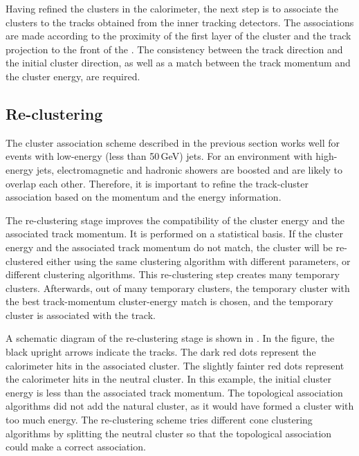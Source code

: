 Having refined the clusters in the calorimeter, the next step is to associate the clusters to the tracks obtained from the inner tracking detectors. The associations  are made according to the proximity of the first layer of the cluster and the track projection to the front of the \ECAL. The consistency between the track direction and the initial cluster direction, as well as a match between the track momentum and the cluster energy, are required.


\subsection{Re-clustering}

The cluster association scheme described in the previous section works well for events with low-energy (less than 50\,GeV) jets. For an environment with  high-energy jets, electromagnetic and  hadronic showers are  boosted and are likely to overlap each other. Therefore, it is important to refine the track-cluster association based on the momentum and the energy information.

The re-clustering stage improves the compatibility of the cluster energy and the associated track momentum. It is performed on a statistical basis. If the cluster energy and the associated track momentum do not match, the cluster will be re-clustered either using the same clustering algorithm with different parameters, or different clustering algorithms. This re-clustering step creates many temporary clusters. Afterwards, out of many temporary clusters, the temporary cluster with the best track-momentum cluster-energy match is chosen, and the temporary cluster is  associated with the track.


A schematic diagram of the re-clustering stage is shown in . In the figure, the black upright arrows indicate the tracks. The dark red dots represent the calorimeter hits in the associated cluster. The  slightly fainter red  dots represent the calorimeter hits in the neutral cluster. In this example, the initial cluster energy is less than the associated track momentum. The topological association algorithms did not add the natural cluster, as it would have formed a cluster with too much energy. The re-clustering scheme tries different cone clustering algorithms by splitting the neutral cluster so that the topological association could make a correct association.


